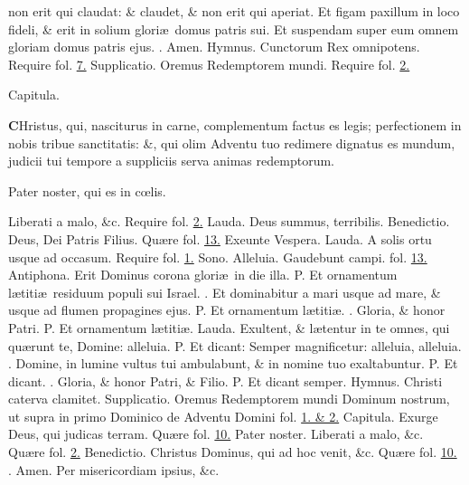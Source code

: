 \documentclass[letter,11pt]{book}
\makeatletter
\DeclareRobustCommand{\Vbar}{\vers@resp{-0.1em}{V}}
\DeclareRobustCommand{\Rbar}{\vers@resp{0pt}{R}}
\newcommand{\vers@resp@sym}{\raisebox{0.2ex}{\rotatebox[origin=c]{-20}{$\m@th\rceil$}}}
\newcommand{\vers@resp}[2]{%
  {\ooalign{\hidewidth\kern#1\vers@resp@sym\hidewidth\cr#2\cr}}%
}%
\def\P{\color{Red} P. \color{black}}
\def\V{\color{Red} \Vbar . \color{black}}
\def\R{\color{Red} \Rbar . \color{black}}
\makeatother
\begin{document}
\begin{multicols}{2}
non erit qui claudat: \& claudet, \& non erit qui aperiat. Et figam paxillum in loco fideli, \& erit in solium glori\ae \ domus patris sui. Et suspendam super eum omnem gloriam domus patris ejus. \R Amen. \color{Red} Hymnus. \color{black} Cunctorum Rex omnipotens. \color{Red} Require fol. \color{black} \hyperlink{page.7}{7.} \color{Red} Supplicatio. \color{black} Oremus Redemptorem mundi. \color{Red} Require fol. \color{black} \hyperlink{Supplicatio}{2.}
\vspace{-.75em} \begin{center} \color{Red} Capitula. \end{center} \vspace{-.75em}
\lettrine[lines=2]{\bfseries \color{Red} C}{}Hristus, qui, nasciturus in carne, complementum factus es legis; perfectionem in nobis tribue sanctitatis: \&, qui olim Adventu tuo redimere dignatus es mundum, judicii tui tempore a suppliciis serva animas redemptorum.
\par Pater noster, qui es in c\oe lis.
\par Liberati a malo, \&c. \color{Red} Require fol. \color{black} \hyperlink{page.2}{2.}
\newline \color{Red} Lauda. \color{black} Deus summus, terribilis. \color{Red} Benedictio. \color{black} Deus, Dei Patris Filius. \color{Red} Qu\ae re fol. \color{black} \hyperlink{page.13}{13.}
\newline \color{Red} \hypertarget{DOM-SECUNDA-ADV-VES-II}{Exeunte Vespera.} Lauda. \color{black} A solis ortu usque ad occasum. \color{Red} Require fol. \color{black} \hyperlink{page.1}{1.}
\newline \color{Red} Sono. \color{black} Alleluia. Gaudebunt campi. \color{Red} fol. \color{black} \hyperlink{page.13}{13.}
\newline \color{Red} Antiphona. \color{black} Erit Dominus corona glori\ae \ in die illa. \P Et ornamentum l\ae titi\ae \ residuum populi sui Israel. \V Et dominabitur a mari usque ad mare, \& usque ad flumen propagines ejus. \P Et ornamentum l\ae titi\ae . \V Gloria, \& honor Patri. \P Et ornamentum l\ae titi\ae .
\newline \color{Red} Lauda. \color{black} Exultent, \& l\ae tentur in te omnes, qui qu\ae runt te, Domine: alleluia. \P Et dicant: Semper magnificetur: alleluia, alleluia. \V Domine, in lumine vultus tui ambulabunt, \& in nomine tuo exaltabuntur. \P Et dicant. \V Gloria, \& honor Patri, \& Filio. \P Et dicant semper.
\color{Red} Hymnus. \color{black} Christi caterva clamitet. \color{Red} Supplicatio. \color{black} Oremus Redemptorem mundi Dominum nostrum, \color{Red} ut supra in primo Dominico de Adventu Domini fol. \color{black} \hyperlink{DOM-PRIMA-ADV-VES}{1. \& 2.} \color{Red} Capitula. \color{black} Exurge Deus, qui judicas terram. \color{Red} Qu\ae re fol. \color{black} \hyperlink{page.10}{10.} Pater noster. Liberati a malo, \&c. \color{Red} Qu\ae re fol. \color{black} \hyperlink{page.2}{2.} \color{Red} Benedictio. \color{black} Christus Dominus, qui ad hoc venit, \&c. \color{Red} Qu\ae re fol. \color{black} \hyperlink{page.10}{10.} \R Amen. Per misericordiam ipsius, \&c.

\end{multicols}
\end{document}
